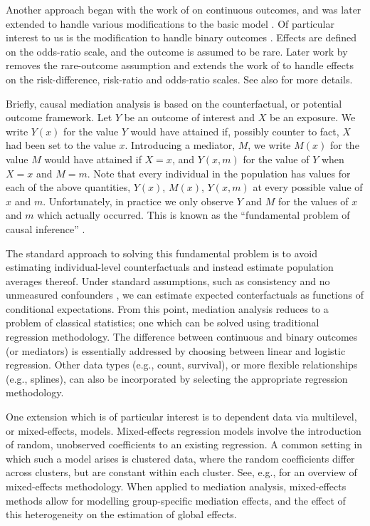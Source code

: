 \documentclass{article}
\begin{document}
Another approach began with the work of \citet{Van09} on continuous outcomes, and was later extended to handle various modifications to the basic model \citep{Van10, Van13, Van14}. Of particular interest to us is the modification to handle binary outcomes \citep{Van10}. Effects are defined on the odds-ratio scale, and the outcome is assumed to be rare. Later work by \citet{Sam21} removes the rare-outcome assumption and extends the work of \citet{Van09} to handle effects on the risk-difference, risk-ratio and odds-ratio scales. See also \citet{Sam18,Sam23} for more details.

Briefly, causal mediation analysis is based on the counterfactual, or potential outcome framework. Let $Y$ be an outcome of interest and $X$ be an exposure. We write $Y(x)$ for the value $Y$ would have attained if, possibly counter to fact, $X$ had been set to the value $x$. Introducing a mediator, $M$, we write $M(x)$ for the value $M$ would have attained if $X=x$, and $Y(x, m)$ for the value of $Y$ when $X=x$ and $M=m$. Note that every individual in the population has values for each of the above quantities, $Y(x)$, $M(x)$, $Y(x,m)$ at every possible value of $x$ and $m$. Unfortunately, in practice we only observe $Y$ and $M$ for the values of $x$ and $m$ which actually occurred. This is known as the ``fundamental problem of causal inference'' \citep{Din18, Hol86}. 

The standard approach to solving this fundamental problem is to avoid estimating individual-level counterfactuals and instead estimate population averages thereof. Under standard assumptions, such as consistency and no unmeasured confounders \citep[see, e.g.,][]{Pea09}, we can estimate expected conterfactuals as functions of conditional expectations. From this point, mediation analysis reduces to a problem of classical statistics; one which can be solved using traditional regression methodology. The difference between continuous and binary outcomes (or mediators) is essentially addressed by choosing between linear and logistic regression. Other data types (e.g., count, survival), or more flexible relationships (e.g., splines), can also be incorporated by selecting the appropriate regression methodology.

One extension which is of particular interest is to dependent data via multilevel, or mixed-effects, models. Mixed-effects regression models involve the introduction of random, unobserved coefficients to an existing regression. A common setting in which such a model arises is clustered data, where the random coefficients differ across clusters, but are constant within each cluster. See, e.g., \citet{Dem04} for an overview of mixed-effects methodology. When applied to mediation analysis, mixed-effects methods allow for modelling group-specific mediation effects, and the effect of this heterogeneity on the estimation of global effects.
\end{document}
